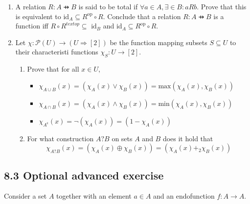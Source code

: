 \documentclass[10pt,\jkfside,a4paper]{article}
\begin{document}
\begin{enumerate}

\item A relation $R: A \pfun B$ is said to be total if $\forall a \in A, \exists  \in B: a R b$. Prove 
that this is equivalent to id$_A \subseteq R^{\text{op}} \circ R$. Conclude that a relation $R: A \pfun B$ 
is a function iff $R \circ R^{text{op}} \subseteq \text{ id}_B$ and id$_A \subseteq R^{\text{op}} \circ R$.



\item Let $\chi: \mathcal{P}(U) \rightarrow (U \Rightarrow [2])$ be the function mapping subsets 
$S \subseteq U$ to their characteristi functions $\chi_S: U \rightarrow [2]$.

\begin{enumerate}

\item Prove that for all $x \in U$,

\begin{itemize}

\item $\chi_{A \cup B}(x) = (\chi_A(x) \vee \chi_B(x)) = \text{max}(\chi_A(x), \chi_B(x))$

\item $\chi_{A \cap B}(x) = (\chi_A(x) \wedge \chi_B(x)) = \text{min}(\chi_A(x), \chi_B(x))$

\item $\chi_{A^{\mathsf{c}}}(x) = ¬(\chi_A(x)) = (1 - \chi_A(x))$

\end{itemize}

\item For what construction $A ? B$ on sets $A$ and $B$ does it hold that 
\begin{equation}
\chi_{A ? B}(x) = (\chi_A(x) \oplus \chi_B(x)) = (\chi_A(x) +_2 \chi_B(x))
\end{equation}



\end{enumerate}

\end{enumerate}

\subsection*{8.3 Optional advanced exercise}

Consider a set $A$ together with an element $a \in A$ and an endofunction $f: A \rightarrow A$.
\end{document}
